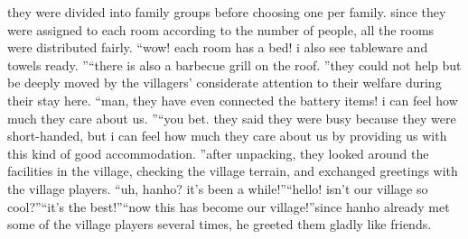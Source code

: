 they were divided into family groups before choosing one per family.
 since they were assigned to each room according to the number of people, all the rooms were distributed fairly.
“wow! each room has a bed! i also see tableware and towels ready.
”“there is also a barbecue grill on the roof.
”they could not help but be deeply moved by the villagers’ considerate attention to their welfare during their stay here.
“man, they have even connected the battery items! i can feel how much they care about us.
”“you bet.
 they said they were busy because they were short-handed, but i can feel how much they care about us by providing us with this kind of good accommodation.
”after unpacking, they looked around the facilities in the village, checking the village terrain, and exchanged greetings with the village players.
“uh, hanho? it’s been a while!”“hello! isn’t our village so cool?”“it’s the best!”“now this has become our village!”since hanho already met some of the village players several times, he greeted them gladly like friends.

